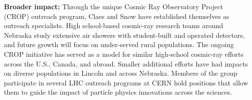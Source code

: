 \documentclass[11pt]{article}
\begin{document}
{\bf Broader impact:}
Through the unique Cosmic Ray
Observatory Project (CROP) outreach program, Claes and Snow have established themselves as outreach specialists.  High school-based cosmic-ray research teams around Nebraska study
extensive air showers with student-built and operated detectors, and future growth will focus on under-served rural
populations. The ongoing CROP initiative has served as a model for similar high-school cosmic-ray efforts across the U.S., Canada, and abroad.  Smaller additional efforts
have had impacts on diverse populations in Lincoln and across
Nebraska. Members of the group participate in several LHC outreach programs at CERN hold positions that allow them to guide the impact of particle physics innovations across the sciences.
\end{document}
